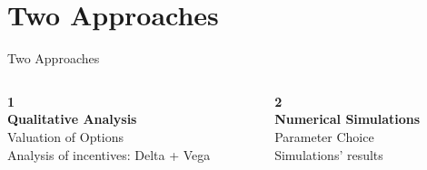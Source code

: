 \documentclass{beamer}
\begin{document}
\section{Two Approaches}
\begin{frame}{Two Approaches}
    \begin{columns}[c]
        \begin{column}{0.5\textwidth} 
            \centering
            \Huge \textbf{1}\\
            \large
            \textbf{Qualitative Analysis}\\
            \normalsize
            \vspace*{5pt}
            Valuation of Options\\
            Analysis of incentives: Delta + Vega
        \end{column}
        \begin{column}{0.5\textwidth}
            \centering
            \Huge \textbf{2}\\
            \large
            \textbf{Numerical Simulations}\\
            \normalsize
            \vspace*{5pt}
            Parameter Choice\\
            Simulations' results
        \end{column}
    \end{columns}
\end{frame}
\end{document}
